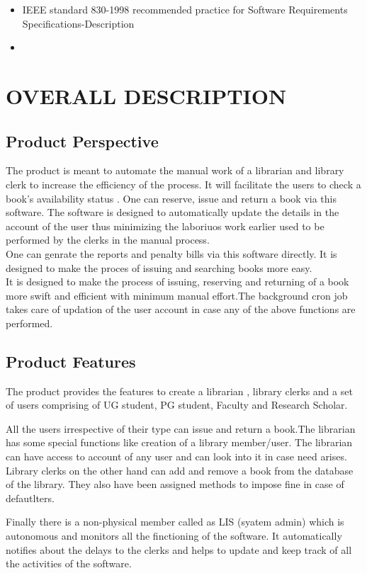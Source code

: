 \documentclass{article}
\begin{document}
\begin{itemize}
\item IEEE standard 830-1998 recommended practice for Software Requirements Specifications-Description
\item 
\end{itemize}


\section{OVERALL DESCRIPTION}
\subsection{Product Perspective}
The product is meant to automate the manual work of a librarian and library clerk to increase the efficiency of the process. It will facilitate the users to check a book's availability status . One can reserve, issue and return a book via this software. The software is designed to automatically update the details in the account of the user thus minimizing the laboriuos work earlier used to be performed by the clerks in the manual process.
\\
One can genrate the reports and penalty bills via this software directly. It is designed to make the proces of issuing and searching books more easy.
\\
It is designed to make the process of issuing, reserving and returning of a book more swift and efficient with minimum manual effort.The background cron job takes care of updation of the user account in case any of the above functions are performed.

\subsection{Product Features}
The product provides the features to create a librarian , library clerks and a set of users comprising of UG student, PG student, Faculty and Research Scholar.

All the users irrespective of their type can issue and return a book.The librarian has some special functions like creation of a library member/user. The librarian can have access to account of any user and can look into it in case need arises.
Library clerks on the other hand can add and remove a book from the database of the library. They also have been assigned methods to impose fine in case of defautlters.

Finally there is a non-physical member called as LIS (syatem admin) which is autonomous and monitors all the finctioning of the software. It automatically notifies about the delays to the clerks and helps to update and keep track of all the activities of the software.
\end{document}
